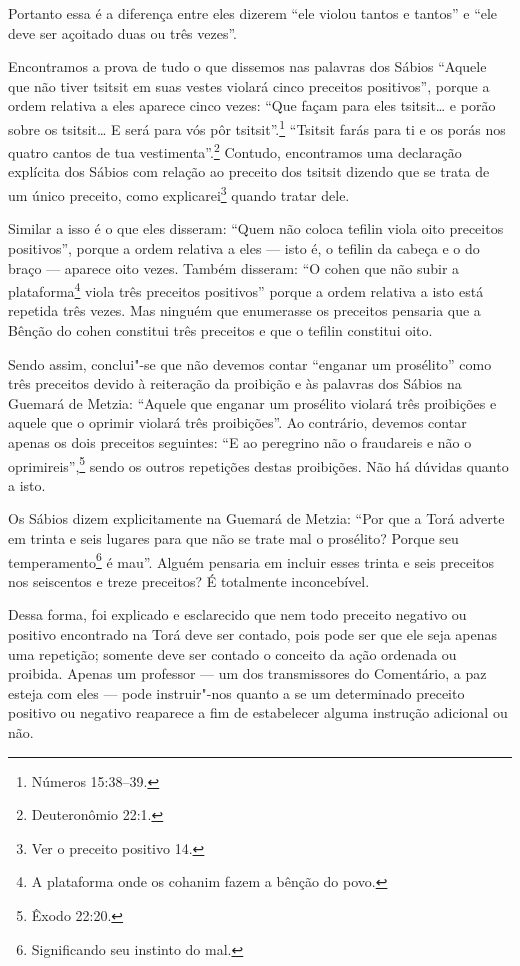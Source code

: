 Portanto essa é a diferença entre eles dizerem ``ele violou tantos e
tantos'' e ``ele deve ser açoitado duas ou três vezes''.

Encontramos a prova de tudo o que dissemos nas palavras dos Sábios
``Aquele que não tiver tsitsit\starr{} em suas vestes violará cinco preceitos
positivos'', porque a ordem relativa a eles aparece cinco vezes: ``Que
façam para eles tsitsit\starr\ldots{} e porão sobre os tsitsit\starr\ldots{} E será para
vós pôr tsitsit\starr''.\footnote{Números 15:38--39.} ``Tsitsit\starr{} farás para ti e os porás nos quatro cantos de tua vestimenta''.\footnote{Deuteronômio 22:1.} Contudo,
encontramos uma declaração explícita dos Sábios com relação ao preceito
dos tsitsit\starr{} dizendo que se trata de um único preceito, como
explicarei\footnote{Ver o preceito positivo 14.} quando tratar dele.


Similar a isso é o que eles disseram: ``Quem não coloca tefilin\starr{} viola oito preceitos positivos'', porque a ordem relativa a eles --- isto
é, o tefilin\starr{} da cabeça e o do braço --- aparece oito vezes. Também disseram:
``O cohen\starr{} que não subir a plataforma\footnote{A plataforma onde os cohanim\starr{} fazem a bênção do povo.} viola três
preceitos positivos'' porque a ordem relativa a isto está repetida três vezes. Mas ninguém que enumerasse os
preceitos pensaria que a Bênção do cohen\starr{} constitui três preceitos e
que o tefilin\starr{} constitui oito.

Sendo assim, conclui"-se que não devemos contar ``enganar um prosélito''
como três preceitos devido à reiteração da proibição e às palavras dos
Sábios na Guemará\starr{} de Metzia: ``Aquele que enganar um prosélito violará
três proibições e aquele que o oprimir violará três proibições''. Ao
contrário, devemos contar apenas os dois preceitos seguintes: ``E ao
peregrino não o fraudareis e não o oprimireis'',\footnote{Êxodo 22:20.} sendo os
outros repetições destas proibições. Não há dúvidas quanto a isto.

Os Sábios dizem explicitamente na Guemará\starr{} de Metzia: ``Por que a
Torá\starr{} adverte em trinta e seis lugares para que não se trate mal o
prosélito?
Porque seu temperamento\footnote{Significando seu instinto do mal.} é mau''. Alguém pensaria em incluir esses trinta e seis preceitos nos seiscentos e treze preceitos? É totalmente inconcebível.



Dessa forma, foi explicado e esclarecido que nem todo preceito negativo
ou positivo encontrado na Torá\starr{} deve ser contado, pois pode ser que ele
seja apenas uma repetição; somente deve ser contado o conceito da ação
ordenada ou proibida. Apenas um professor --- um dos transmissores do
Comentário, a paz esteja com eles --- pode instruir"-nos quanto a se um
determinado preceito positivo ou negativo reaparece a fim de
estabelecer alguma instrução adicional ou não.

